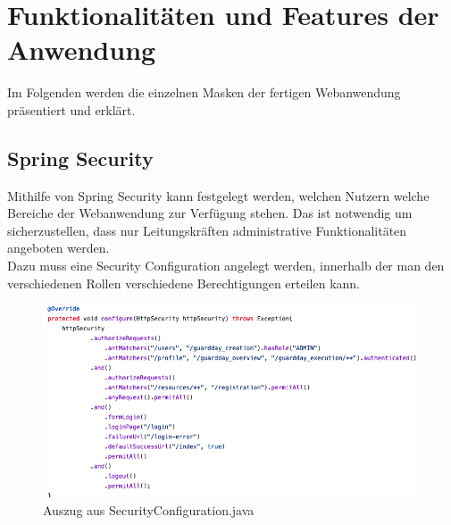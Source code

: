 \documentclass[fontsize=12pt,openright,oneside,paper=a4,BCOR=1cm]{scrbook}
\begin{document}







\section{Funktionalitäten und Features der Anwendung}

Im Folgenden werden die einzelnen Masken der fertigen Webanwendung präsentiert und erklärt.

\subsection{Spring Security}

Mithilfe von Spring Security kann festgelegt werden, welchen Nutzern welche Bereiche der Webanwendung zur Verf\"ugung stehen. Das ist notwendig um sicherzustellen, dass nur Leitungskr\"aften administrative Funktionalit\"aten angeboten werden. \\
Dazu muss eine \glqq Security Configuration\grqq{} angelegt werden, innerhalb der man den verschiedenen Rollen verschiedene Berechtigungen erteilen kann.
\begin{figure}[H]
  \centering
    \includegraphics[width=0.7\linewidth]{Anlagen/Code/SecurityConfiguration.png}
    \caption{Auszug aus SecurityConfiguration.java}
  \label{fig:securityConfiguration}
\end{figure}
\end{document}
